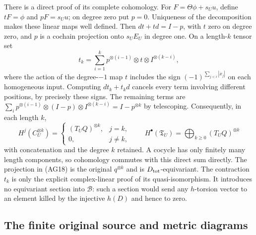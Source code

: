There is a direct proof of its complete cohomology.  For
$F=\Theta\phi+s_Uu$, define $tF=\phi$ and $pF=s_Uu$;
on degree zero put $p=0$.  Uniqueness of the decomposition makes
these linear maps well defined.  Then $dt+td=I-p$, with $t$
zero on degree zero, and $p$ is a cochain projection onto $s_UE_U$
in degree one.  On a length-$k$ tensor set
\[
 t_k=\sum_{i=1}^k p^{\otimes(i-1)}\otimes t\otimes
                  I^{\otimes(k-i)},
 \tag{AG17}
\]
where the action of the degree-$-1$ map $t$ includes the sign
$(-1)^{\sum_{j<i}|x_j|}$ on each homogeneous input.
Computing $dt_k+t_kd$ cancels every term involving different
positions, by precisely these signs.  The remaining terms are
$\sum_i p^{\otimes(i-1)}\otimes(I-p)\otimes
I^{\otimes(k-i)}=I-p^{\otimes k}$ by telescoping.
Consequently, in each length $k$,
\[
 H^j(C_U^{\otimes k})=
 \begin{cases}(T_UQ)^{\otimes k},&j=k,\\0,&j\ne k,
 \end{cases}
 \qquad
 H^\bullet(\mathfrak T_U)=
 \bigoplus_{k\ge0}(T_UQ)^{\otimes k}
 \tag{AG18}
\]
with concatenation and the degree $k$ retained.  A cocycle has
only finitely many length components, so cohomology commutes with
this direct sum directly.  The projection in (AG18) is the original
$q^{\otimes k}$ and is $D_{\rm tot}$-equivariant.  The contraction
$t_k$ is only the explicit complex-linear proof of its
quasi-isomorphism.  It introduces no equivariant section into
$\mathscr B$: such a section would send any $h$-torsion vector
to an element killed by the injective $h(D)$ and hence to zero.

\subsection{The finite original source and metric diagrams}

